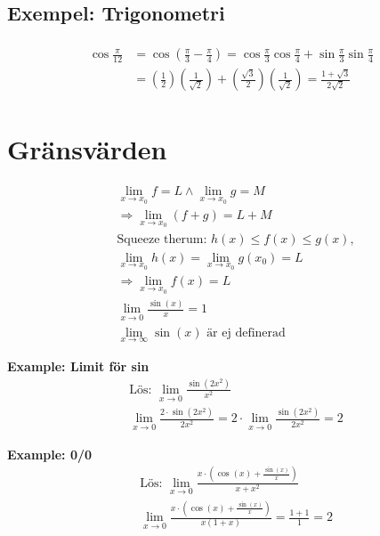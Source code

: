 \begin{multicols}{2}
\subsection{Exempel: Trigonometri}
\begin{align*}
  \begin{aligned} \cos \frac { \pi } { 12 } & = \cos \left( \frac { \pi } { 3 } - \frac { \pi } { 4 } \right) = \cos \frac { \pi } { 3 } \cos \frac { \pi } { 4 } + \sin \frac { \pi } { 3 } \sin \frac { \pi } { 4 } \\ & = \left( \frac { 1 } { 2 } \right) \left( \frac { 1 } { \sqrt { 2 } } \right) + \left( \frac { \sqrt { 3 } } { 2 } \right) \left( \frac { 1 } { \sqrt { 2 } } \right) = \frac { 1 + \sqrt { 3 } } { 2 \sqrt { 2 } } \end{aligned}
\end{align*}


\section{Gränsvärden}
\begin{align*}
  &\lim_{x\to x_0} f = L \land \lim_{x\to x_0} g = M \\
  &\Rightarrow \lim_{x\to x_0}(f+g) = L+M  \\
  &\text{Squeeze therum: } h(x) \leq f(x) \leq g(x), \\
  &\lim_{x\to x_0} h(x) = \lim_{x\to x_0} g(x_0) = L \\
  &\Rightarrow \lim_{x\to x_0} f(x) = L \\
  &\lim_{x\to 0} \frac{\sin(x)}{x}=1  \\
  &\lim_{x\to\infty} \sin(x) \text{ är ej definerad}
\end{align*}


\textbf{Example: Limit för sin}
\begin{align*}
  &\text{Lös: } \lim_{x\to 0} \frac{\sin(2x^2)}{x^2}  \\
  &\lim_{x\to 0} \frac{2 \cdot \sin(2x^2)}{2x^2} = 2 \cdot \lim_{x\to 0} \frac{\sin(2x^2)}{2x^2} = 2
\end{align*}

\textbf{Example: 0/0}
\begin{align*}
  &\text{Lös: } \lim_{x\to 0} \frac{x \cdot \left( \cos(x) + \frac{\sin(x)}{x} \right) }{x+x^2} \\
  &\lim_{x\to 0} \frac{ x \cdot \left( \cos(x) + \frac{ \sin(x) }{ x } \right) }{x(1+x)} = \frac{1+1}{1} = 2  \\
\end{align*}


\end{multicols}
